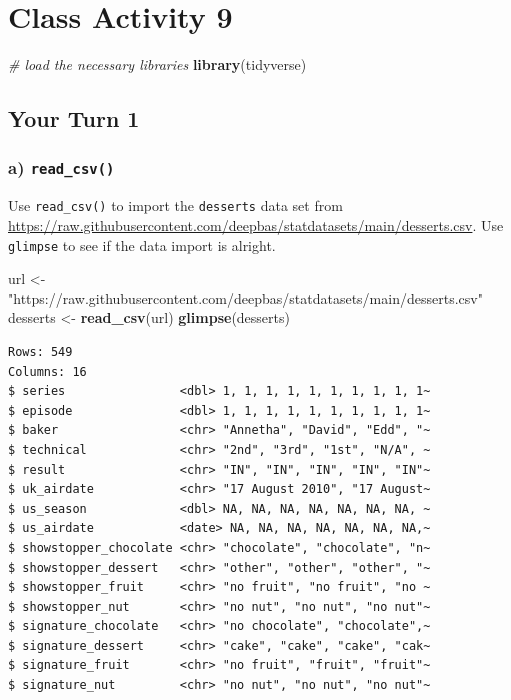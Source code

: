 \documentclass[
]{book}
\newenvironment{Shaded}{\begin{snugshade}}{\end{snugshade}}
\newcommand{\CommentTok}[1]{\textcolor[rgb]{0.56,0.35,0.01}{\textit{#1}}}
\newcommand{\FunctionTok}[1]{\textcolor[rgb]{0.13,0.29,0.53}{\textbf{#1}}}
\newcommand{\NormalTok}[1]{#1}
\newcommand{\OtherTok}[1]{\textcolor[rgb]{0.56,0.35,0.01}{#1}}
\newcommand{\StringTok}[1]{\textcolor[rgb]{0.31,0.60,0.02}{#1}}
\begin{document}
\hypertarget{class-activity-9}{%
\chapter{Class Activity 9}\label{class-activity-9}}

\begin{Shaded}
\begin{Highlighting}[]
\CommentTok{\# load the necessary libraries}
\FunctionTok{library}\NormalTok{(tidyverse)}
\end{Highlighting}
\end{Shaded}

\hypertarget{your-turn-1-2}{%
\section{Your Turn 1}\label{your-turn-1-2}}

\hypertarget{a-read_csv}{%
\subsection{\texorpdfstring{a) \texttt{read\_csv()}}{a) read\_csv()}}\label{a-read_csv}}

Use \texttt{read\_csv()} to import the \texttt{desserts} data set from \url{https://raw.githubusercontent.com/deepbas/statdatasets/main/desserts.csv}. Use \texttt{glimpse} to see if the data import is alright.

\begin{Shaded}
\begin{Highlighting}[]
\NormalTok{url }\OtherTok{\textless{}{-}} \StringTok{"https://raw.githubusercontent.com/deepbas/statdatasets/main/desserts.csv"}
\NormalTok{desserts }\OtherTok{\textless{}{-}} \FunctionTok{read\_csv}\NormalTok{(url)}
\FunctionTok{glimpse}\NormalTok{(desserts)}
\end{Highlighting}
\end{Shaded}

\begin{verbatim}
Rows: 549
Columns: 16
$ series                <dbl> 1, 1, 1, 1, 1, 1, 1, 1, 1, 1~
$ episode               <dbl> 1, 1, 1, 1, 1, 1, 1, 1, 1, 1~
$ baker                 <chr> "Annetha", "David", "Edd", "~
$ technical             <chr> "2nd", "3rd", "1st", "N/A", ~
$ result                <chr> "IN", "IN", "IN", "IN", "IN"~
$ uk_airdate            <chr> "17 August 2010", "17 August~
$ us_season             <dbl> NA, NA, NA, NA, NA, NA, NA, ~
$ us_airdate            <date> NA, NA, NA, NA, NA, NA, NA,~
$ showstopper_chocolate <chr> "chocolate", "chocolate", "n~
$ showstopper_dessert   <chr> "other", "other", "other", "~
$ showstopper_fruit     <chr> "no fruit", "no fruit", "no ~
$ showstopper_nut       <chr> "no nut", "no nut", "no nut"~
$ signature_chocolate   <chr> "no chocolate", "chocolate",~
$ signature_dessert     <chr> "cake", "cake", "cake", "cak~
$ signature_fruit       <chr> "no fruit", "fruit", "fruit"~
$ signature_nut         <chr> "no nut", "no nut", "no nut"~
\end{verbatim}
\end{document}
